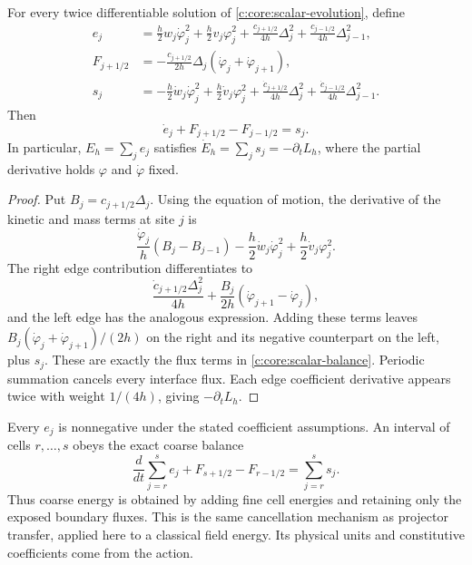 \begin{proposition}
\label{c:core:scalar-work}
For every twice differentiable solution of
\eqref{c:core:scalar-evolution}, define
\begin{align}
 e_j&=\frac h2w_j\dot\varphi_j^2+\frac h2v_j\varphi_j^2
 +\frac{c_{j+1/2}}{4h}\Delta_j^2
 +\frac{c_{j-1/2}}{4h}\Delta_{j-1}^2,\nonumber\\
 F_{j+1/2}&=-\frac{c_{j+1/2}}{2h}\Delta_j
             (\dot\varphi_j+\dot\varphi_{j+1}),\nonumber\\
 s_j&=-\frac h2\dot w_j\dot\varphi_j^2
 +\frac h2\dot v_j\varphi_j^2
 +\frac{\dot c_{j+1/2}}{4h}\Delta_j^2
 +\frac{\dot c_{j-1/2}}{4h}\Delta_{j-1}^2.
 \label{c:core:scalar-densities}
\end{align}
Then
\begin{equation}
 \dot e_j+F_{j+1/2}-F_{j-1/2}=s_j.
 \label{c:core:scalar-balance}
\end{equation}
In particular, $E_h=\sum_je_j$ satisfies
$\dot E_h=\sum_js_j=-\partial_tL_h$, where the partial derivative holds
$\varphi$ and $\dot\varphi$ fixed.
\end{proposition}

\begin{proof}
Put $B_j=c_{j+1/2}\Delta_j$. Using the equation of motion, the derivative
of the kinetic and mass terms at site $j$ is
\[
 \frac{\dot\varphi_j}{h}(B_j-B_{j-1})
 -\frac h2\dot w_j\dot\varphi_j^2
 +\frac h2\dot v_j\varphi_j^2.
\]
The right edge contribution differentiates to
\[
 \frac{\dot c_{j+1/2}\Delta_j^2}{4h}
 +\frac{B_j}{2h}(\dot\varphi_{j+1}-\dot\varphi_j),
\]
and the left edge has the analogous expression. Adding these terms
leaves
$B_j(\dot\varphi_j+\dot\varphi_{j+1})/(2h)$ on the right and its
negative counterpart on the left, plus $s_j$. These are exactly the flux
terms in \eqref{c:core:scalar-balance}. Periodic summation cancels every
interface flux. Each edge coefficient derivative appears twice with
weight $1/(4h)$, giving $-\partial_tL_h$.
\end{proof}

Every $e_j$ is nonnegative under the stated coefficient assumptions. An
interval of cells $r,\ldots,s$ obeys the exact coarse balance
\[
 \frac{d}{dt}\sum_{j=r}^se_j
 +F_{s+1/2}-F_{r-1/2}=\sum_{j=r}^ss_j.
\]
Thus coarse energy is obtained by adding fine cell energies and retaining
only the exposed boundary fluxes. This is the same cancellation mechanism
as projector transfer, applied here to a classical field energy. Its
physical units and constitutive coefficients come from the action.

